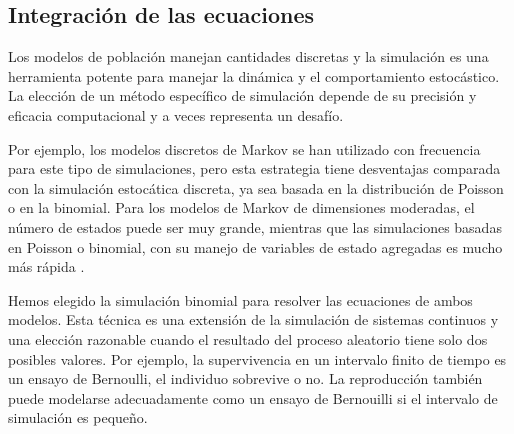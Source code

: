\subsection{Integración de las ecuaciones}
\label{DINAMINCA_NumSim}

Los modelos de población manejan cantidades discretas y la simulación es una herramienta potente para manejar la dinámica y el comportamiento estocástico. La elección de un método específico de simulación depende de su precisión y eficacia computacional y a veces representa un desafío.

Por ejemplo, los modelos discretos de Markov se han utilizado con frecuencia para este tipo de simulaciones, pero esta estrategia tiene desventajas comparada con la simulación estocática discreta, ya sea basada en la distribución de Poisson o en la binomial. Para los modelos de Markov de dimensiones moderadas, el número de estados puede ser muy grande, mientras que las simulaciones basadas en Poisson o binomial, con su manejo de variables de estado agregadas es mucho más rápida  \cite{gustafsson2007bringing, balcan2009multiscale}.

Hemos elegido la simulación binomial para resolver las ecuaciones de ambos modelos. Esta técnica es una extensión de la simulación de sistemas continuos y una elección razonable cuando el resultado del proceso aleatorio tiene solo dos posibles valores. Por ejemplo, la supervivencia en un intervalo finito de tiempo es un ensayo de Bernoulli, el individuo sobrevive o no. La reproducción también puede modelarse adecuadamente como un ensayo de Bernouilli si el intervalo de simulación es pequeño. 

